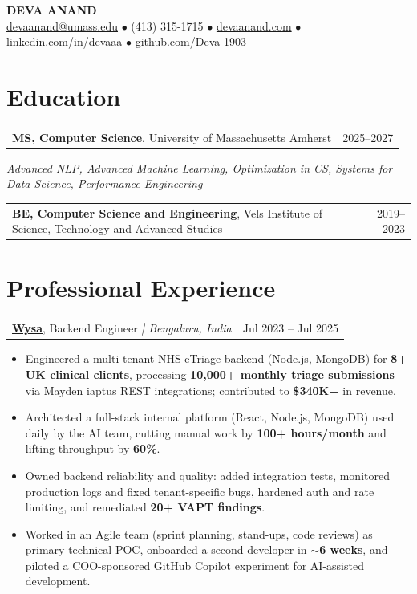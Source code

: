 \documentclass[letterpaper,11pt]{article}
\makeatletter
\newcommand{\eduItem}[3]{%
  \begin{tabular*}{\textwidth}{@{}l@{\extracolsep{\fill}}r@{}}
    \textbf{#1}, #2 & #3 \\
  \end{tabular*}\par
}
\newcommand{\expItem}[4]{%
  \vspace{3pt}
  \begin{tabular*}{\textwidth}{@{}l@{\extracolsep{\fill}}r@{}}
    \textbf{#1}, #2 \textit{| #3} & #4 \\
  \end{tabular*}\par\vspace{-2pt}
}
\makeatother
\begin{document}
\begin{center}
    {\fontsize{18}{20}\selectfont\bfseries DEVA ANAND}\\ \vspace{3pt}
    {\small
    \href{mailto:devaanand@umass.edu}{devaanand@umass.edu}
    \enspace$\bullet$\enspace
    (413) 315-1715
    \enspace$\bullet$\enspace
    \href{https://devaanand.com}{devaanand.com}
    \enspace$\bullet$\enspace
    \href{https://linkedin.com/in/devaaa/}{linkedin.com/in/devaaa}
    \enspace$\bullet$\enspace
    \href{https://github.com/Deva-1903}{github.com/Deva-1903}}
\end{center}
\vspace{-6pt}

\section{Education}
\eduItem{MS, Computer Science}{University of Massachusetts Amherst}{2025--2027}
{\small\textit{Advanced NLP, Advanced Machine Learning, Optimization in CS, Systems for Data Science, Performance Engineering}}\par
\vspace{3pt}
\eduItem{BE, Computer Science and Engineering}{Vels Institute of Science, Technology and Advanced Studies}{2019--2023}

\section{Professional Experience}

\expItem{\href{https://www.wysa.io}{Wysa}}{Backend Engineer}{Bengaluru, India}{Jul 2023 -- Jul 2025}
\begin{itemize}
  \item Engineered a multi-tenant NHS eTriage backend (Node.js, MongoDB) for \textbf{8+ UK clinical clients}, processing \textbf{10{,}000+ monthly triage submissions} via Mayden iaptus REST integrations; contributed to \textbf{\$340K+} in revenue.
  \item Architected a full-stack internal platform (React, Node.js, MongoDB) used daily by the AI team, cutting manual work by \textbf{100+ hours/month} and lifting throughput by \textbf{60\%}.
  \item Owned backend reliability and quality: added integration tests, monitored production logs and fixed tenant-specific bugs, hardened auth and rate limiting, and remediated \textbf{20+ VAPT findings}.
  \item Worked in an Agile team (sprint planning, stand-ups, code reviews) as primary technical POC, onboarded a second developer in \textbf{$\sim$6 weeks}, and piloted a COO-sponsored GitHub Copilot experiment for AI-assisted development.
\end{itemize}
\end{document}
